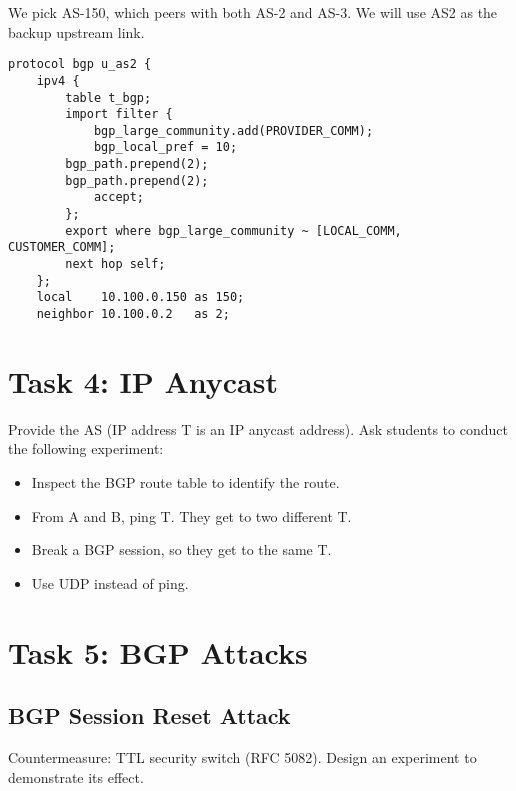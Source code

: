 We pick AS-150, which peers with both AS-2 and AS-3. 
We will use AS2 as the backup upstream link.

\begin{lstlisting}
protocol bgp u_as2 {
    ipv4 {
        table t_bgp;
        import filter {
            bgp_large_community.add(PROVIDER_COMM);
            bgp_local_pref = 10;
	    bgp_path.prepend(2);
	    bgp_path.prepend(2);
            accept;
        };
        export where bgp_large_community ~ [LOCAL_COMM, CUSTOMER_COMM];
        next hop self;
    };
    local    10.100.0.150 as 150;
    neighbor 10.100.0.2   as 2;
\end{lstlisting}
 


\section{Task 4: IP Anycast} 

Provide the AS (IP address T is an IP anycast address). 
Ask students to conduct the following experiment:

\begin{itemize}
  \item Inspect the BGP route table to identify the route.
  \item From A and B, ping T. They get to two different T.
  \item Break a BGP session, so they get to the same T.
  \item Use UDP instead of ping.
\end{itemize}
 


\section{Task 5: BGP Attacks} 


\subsection{BGP Session Reset Attack} 



Countermeasure: TTL security switch (RFC 5082).
Design an experiment to demonstrate its effect.

